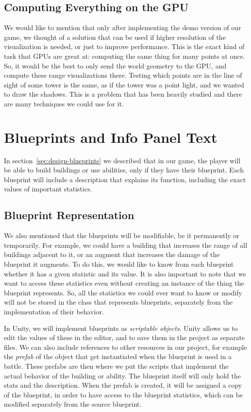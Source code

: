 \subsection{Computing Everything on the GPU}

We would like to mention that only after implementing the demo version of our game, we thought of a solution that can be used if higher resolution of the visualization is needed, or just to improve performance.
This is the exact kind of task that GPUs are great at: computing the same thing for many points at once.
So, it would be the best to only send the world geometry to the GPU, and compute these range visualizations there.
Testing which points are in the line of sight of some tower is the same, as if the tower was a point light, and we wanted to draw the shadows.
This is a problem that has been heavily studied and there are many techniques we could use for it.

\section{Blueprints and Info Panel Text}

In section~\ref{sec:design-blueprints} we described that in our game, the player will be able to build buildings or use abilities, only if they have their blueprint.
Each blueprint will include a description that explains its function, including the exact values of important statistics.

\subsection{Blueprint Representation}

We also mentioned that the blueprints will be modifiable, be it permanently or temporarily.
For example, we could have a building that increases the range of all buildings adjacent to it, or an augment that increases the damage of the blueprint it augments.
To do this, we would like to know from each blueprint whether it has a given statistic and its value.
It is also important to note that we want to access these statistics even without creating an instance of the thing the blueprint represents.
So, all the statistics we could ever want to know or modify will not be stored in the class that represents blueprints, separately from the implementation of their behavior.

In Unity, we will implement blueprints as \emph{scriptable objects}.
Unity allows us to edit the values of these in the editor, and to save them in the project as separate files.
We can also include references to other resources in our project, for example the \emph{prefab} of the object that get instantiated when the blueprint is used in a battle.
These prefabs are then where we put the scripts that implement the actual behavior of the building or ability.
The blueprint itself will only hold the stats and the description.
When the prefab is created, it will be assigned a copy of the blueprint, in order to have access to the blueprint statistics, which can be modified separately from the source blueprint.

